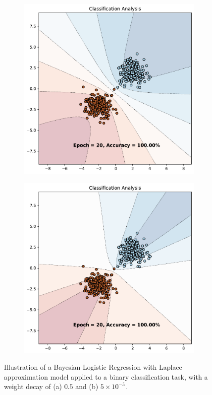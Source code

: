\begin{figure}[H]
    \centering
    \begin{subfigure}{0.45\textwidth}
        \includegraphics[width=\textwidth]{laplace_approx_0.5.pdf}
        \caption{}
        \label{subfig:weight_decay_high}
    \end{subfigure}%
    \begin{subfigure}{0.45\textwidth}
        \includegraphics[width=\textwidth]{laplace_approx_5e-05.pdf}
        \caption{}
        \label{subfig:weight_decay_low}
    \end{subfigure}%
    \caption{Illustration of a Bayesian Logistic Regression with Laplace approximation model applied to a binary classification task, with a weight decay of (a) $0.5$ and (b) $5 \times 10^{-5}$.}
    \label{fig:weight_decay}
\end{figure}



